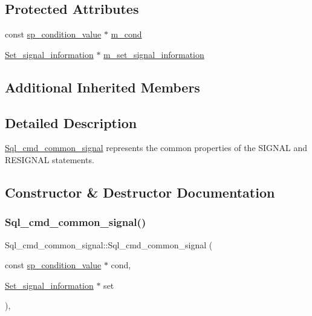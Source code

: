 \subsection*{Protected Attributes}
\begin{DoxyCompactItemize}
\item 
const \mbox{\hyperlink{classsp__condition__value}{sp\+\_\+condition\+\_\+value}} $\ast$ \mbox{\hyperlink{classSql__cmd__common__signal_a5ec928fbd9312027097edd4862af0004}{m\+\_\+cond}}
\item 
\mbox{\hyperlink{classSet__signal__information}{Set\+\_\+signal\+\_\+information}} $\ast$ \mbox{\hyperlink{classSql__cmd__common__signal_a630c5723e27ee3e92be44d723f794465}{m\+\_\+set\+\_\+signal\+\_\+information}}
\end{DoxyCompactItemize}
\subsection*{Additional Inherited Members}


\subsection{Detailed Description}
\mbox{\hyperlink{classSql__cmd__common__signal}{Sql\+\_\+cmd\+\_\+common\+\_\+signal}} represents the common properties of the S\+I\+G\+N\+AL and R\+E\+S\+I\+G\+N\+AL statements. 

\subsection{Constructor \& Destructor Documentation}
\mbox{\label{classSql__cmd__common__signal_a0244836afdcb89c3e9ff3b80c90dd908}} 
\subsubsection{\texorpdfstring{Sql\+\_\+cmd\+\_\+common\+\_\+signal()}{Sql\_cmd\_common\_signal()}}
{\footnotesize\ttfamily Sql\+\_\+cmd\+\_\+common\+\_\+signal\+::\+Sql\+\_\+cmd\+\_\+common\+\_\+signal (\begin{DoxyParamCaption}\item[{const \mbox{\hyperlink{classsp__condition__value}{sp\+\_\+condition\+\_\+value}} $\ast$}]{cond,  }\item[{\mbox{\hyperlink{classSet__signal__information}{Set\+\_\+signal\+\_\+information}} $\ast$}]{set }\end{DoxyParamCaption})\hspace{0.3cm}{\ttfamily [inline]}, {\ttfamily [protected]}}

